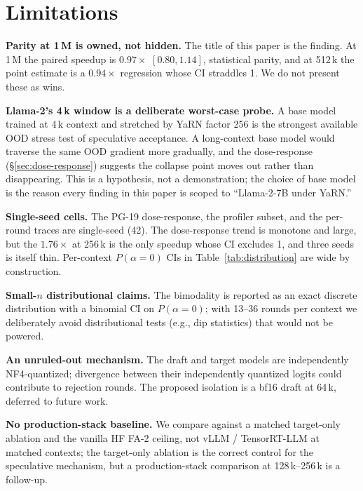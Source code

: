 \documentclass{article}
\begin{document}
\section{Limitations}
\label{sec:limitations}

\textbf{Parity at 1\,M is owned, not hidden.} The title of this
paper is the finding. At 1\,M the paired speedup is
$0.97\times$ $[0.80, 1.14]$, statistical parity, and at
512\,k the point estimate is a $0.94\times$ regression whose CI
straddles 1. We do not present these as wins.

\textbf{Llama-2's 4\,k window is a deliberate worst-case probe.}
A base model trained at 4\,k context and stretched by YaRN factor
256 is the strongest available OOD stress test of speculative
acceptance. A long-context base model would traverse the same OOD
gradient more gradually, and the dose-response
(\S\ref{sec:dose-response}) suggests the collapse point moves out
rather than disappearing. This is a hypothesis, not a
demonstration; the choice of base model is the reason every
finding in this paper is scoped to ``Llama-2-7B under YaRN.''

\textbf{Single-seed cells.} The PG-19 dose-response, the profiler
subset, and the per-round traces are single-seed (42). The
dose-response trend is monotone and large, but the $1.76\times$ at
256\,k is the only speedup whose CI excludes 1, and three seeds is
itself thin. Per-context $P(\alpha{=}0)$ CIs in
Table~\ref{tab:distribution} are wide by construction.

\textbf{Small-$n$ distributional claims.} The bimodality is
reported as an exact discrete distribution with a binomial CI on
$P(\alpha{=}0)$; with 13--36 rounds per context we deliberately
avoid distributional tests (e.g., dip statistics) that would not
be powered.

\textbf{An unruled-out mechanism.} The draft and target models
are independently NF4-quantized; divergence between their
independently quantized logits could contribute to rejection
rounds. The proposed isolation is a bf16 draft at 64\,k, deferred
to future work.

\textbf{No production-stack baseline.} We compare against a
matched target-only ablation and the vanilla HF FA-2 ceiling, not
vLLM / TensorRT-LLM at matched contexts; the target-only ablation
is the correct control for the speculative mechanism, but a
production-stack comparison at 128\,k--256\,k is a
follow-up.
\end{document}
